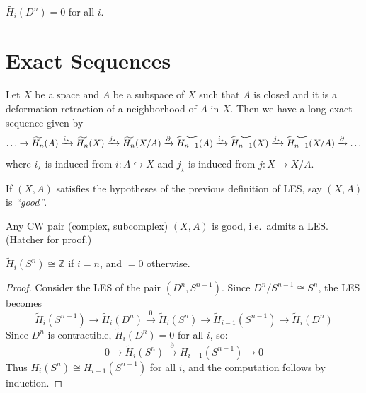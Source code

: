 \documentclass[12pt]{amsart}
\begin{document}
\begin{corollary}
    $\widetilde{H_i} (D^n) = 0$ for all $i$. 
\end{corollary}

\newpage 

\section{Exact Sequences}

\begin{theorem}
    Let $X$ be a space and $A$ be a subspace of $X$ such that $A$ is closed and it is a deformation retraction of a neighborhood of $A$ in $X$. Then we have a long exact sequence given by 
    \[\ldots \to \widetilde{H_n}(A)\xrightarrow{i_\star} \widetilde{H_n}(X) \xrightarrow{j_\star} \widetilde{H_n}(X/A) \xrightarrow{\partial} \widetilde{H_{n-1}}(A) \xrightarrow{i_\star} \widetilde{H_{n-1}}(X) \xrightarrow{j_\star} \widetilde{H_{n-1}}(X/A) \xrightarrow{\partial}\ldots\]
    where $i_\star$ is induced from $i: A \hookrightarrow X$ and $j_\star$ is induced from $j: X \to X/A$. 
\end{theorem}

\begin{definition}
    If $(X, A)$ satisfies the hypotheses of the previous definition of LES, say $(X, A)$ is \emph{``good''}.
\end{definition}


\begin{remark}
    Any CW pair (complex, subcomplex) $(X,A)$ is good, i.e.\ admits a LES. (Hatcher for proof.)
\end{remark}

\begin{corollary}
    $\widetilde{H}_i(S^n) \cong \mathbb{Z}$ if $i = n$, and $= 0$ otherwise.
\end{corollary}

\begin{proof}
    Consider the LES of the pair $(D^n, S^{n-1})$. Since $D^n / S^{n-1} \cong S^n$, the LES becomes
    \[
        \widetilde{H}_i(S^{n-1}) \to \widetilde{H}_i(D^n) \xrightarrow{0} \widetilde{H}_i(S^n) \to \widetilde{H}_{i-1}(S^{n-1}) \to \widetilde{H}_i(D^n)
    \]
    Since $D^n$ is contractible, $\widetilde{H}_i(D^n) = 0$ for all $i$, so:
    \[
        0 \to \widetilde{H}_i(S^n) \xrightarrow{\partial} \widetilde{H}_{i-1}(S^{n-1}) \to 0
    \]
    Thus $H_i(S^n) \cong H_{i-1}(S^{n-1})$ for all $i$, and the computation follows by induction.
\end{proof}
\end{document}
